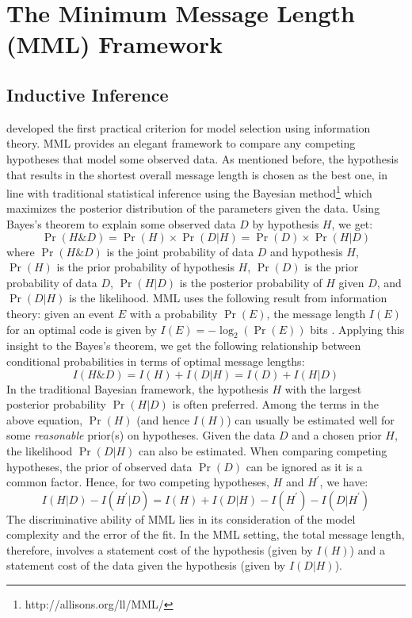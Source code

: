 \documentclass[wcp]{jmlr}
\begin{document}
\section{The Minimum Message Length (MML) Framework}
\subsection{Inductive Inference}
\citet{wallace68} developed the first practical criterion for model selection using 
information theory. MML provides an elegant framework to compare any competing 
hypotheses that model some observed data. As mentioned before, the hypothesis that results in the shortest 
overall message length is chosen as the best one, in line with traditional statistical 
inference using the Bayesian method\footnote{http://allisons.org/ll/MML/} which maximizes
the posterior distribution of the parameters given the data.
Using Bayes's theorem to explain some observed data $D$ by hypothesis $H$, we get:
$$\Pr(H\&D) = \Pr(H) \times \Pr(D|H) = \Pr(D) \times \Pr(H|D)$$
where $\Pr(H\&D)$ is the joint probability of data $D$ and hypothesis $H$, $\Pr(H)$
is the prior probability of hypothesis $H$, $\Pr(D)$ is the prior 
probability of data $D$, $\Pr(H|D)$ is the posterior probability of $H$
given $D$, and $\Pr(D|H)$ is the likelihood.
MML uses the following result from information theory: given an event $E$
with a probability $\Pr(E)$, the message length $I(E)$ for an optimal
code is given by $I(E) = -\log_2 (\Pr(E))$ bits \citep{shannon1948}. Applying this insight
to the Bayes's theorem, we get the following relationship between
conditional probabilities in terms of optimal message lengths:\[I(H\&D) = I(H) + I(D|H) = I(D) + I(H|D)\]
In the traditional Bayesian framework, the hypothesis $H$ with
the largest posterior probability $\Pr(H|D)$ is often preferred.
Among the terms in the above equation, $\Pr(H)$ (and hence $I(H)$) can
usually be estimated well for some \emph{reasonable} prior(s) on hypotheses.
Given the data $D$ and a chosen prior $H$, the likelihood $\Pr(D|H)$ can also be estimated.
When comparing competing hypotheses, the prior of observed data $\Pr(D)$
can be ignored as it is a common factor. Hence, for two competing hypotheses, $H$ and $H^\prime$, we have:
$$I(H|D) - I(H^\prime|D) = I(H) + I(D|H) - I(H^\prime) - I(D|H^\prime)$$
The discriminative ability of MML lies in its consideration of the model
complexity and the error of the fit. In the MML setting, the total message length,
therefore, involves a statement cost of the hypothesis
(given by $I(H)$) and a statement cost of the data given the hypothesis (given by $I(D|H)$). 
\end{document}
